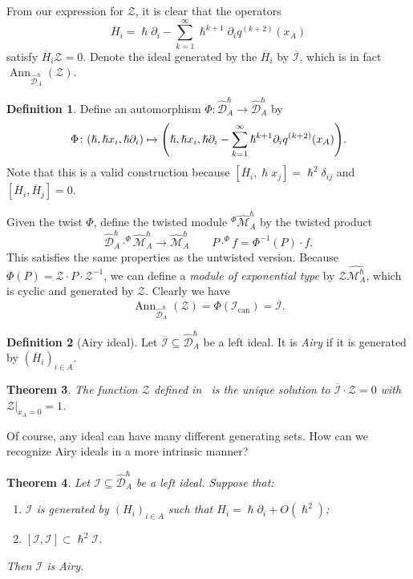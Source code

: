 \documentclass{amsart}
\newtheorem{thm}{Theorem}[section]
\theoremstyle{definition}
\newtheorem{defn}[thm]{Definition}
\theoremstyle{remark}
\theoremstyle{plain}
\theoremstyle{definition}
\theoremstyle{remark}
\newcommand{\mc}[1]{\mathcal{#1}}
\newcommand{\mr}[1]{\mathrm{#1}}
\newcommand{\on}[1]{\operatorname{#1}}
\newcommand{\ol}[1]{\overline{#1}}
\newcommand{\wh}[1]{\widehat{#1}}
\newcommand{\1}{\mathbf{1}}
\newcommand{\2}{\mathbf{2}}
\newcommand{\3}{\mathbf{3}}
\begin{document}
From our expression for $\mc{Z}$, it is clear that the operators
\[ \ol{H}_i = \hslash \partial_i - \sum_{k=1}^{\infty} \hslash^{k+1} \partial_i q^{(k+2)}(x_A) \]
satisfy $\ol{H}_i \mc{Z} = 0$. Denote the ideal generated by the $\ol{H}_i$ by $\ol{\mc{I}}$, which is in fact $\on{Ann}_{\wh{\mc{D}}_A^{\hslash}}(\mc{Z})$.

\begin{defn}
    Define an automorphism $\Phi \colon \wh{\mc{D}}_A^{\hslash} \to \wh{\mc{D}}_A^{\hslash}$ by
    \[ \Phi \colon (\hslash, \hslash x_i, \hslash \partial_i) \mapsto \qty(\hslash, \hslash x_i, \hslash \partial_i - \sum_{k=1}^{\infty} \hslash^{k+1} \partial_i q^{(k+2)}(x_A)). \]
    Note that this is a valid construction because $[\ol{H}_i, \hslash x_j] = \hslash^2 \delta_{ij}$ and $[\ol{H}_i, \ol{H}_j] = 0$.
\end{defn}

Given the twist $\Phi$, define the twisted module ${}^{\Phi}\wh{\mc{M}}_A^{\hslash}$ by the twisted product
\[ \wh{\mc{D}}_A^{\hslash} \cdot^{\Phi} \wh{\mc{M}}_A^{\hslash} \to \wh{\mc{M}}_A^{\hslash} \qquad P \cdot^{\Phi} f = \Phi^{-1}(P) \cdot f. \]
This satisfies the same properties as the untwisted version. Because $\Phi(P) = \mc{Z} \cdot P \cdot \mc{Z}^{-1}$, we can define a \textit{module of exponential type} by $\mc{Z} \wh{\mc{M}_A^{\hslash}}$, which is cyclic and generated by $\mc{Z}$. Clearly we have
\[ \on{Ann}_{\wh{\mc{D}}_A^{\hslash}}(\mc{Z}) = \Phi(\mc{I}_{\mr{can}}) = \ol{\mc{I}}. \]

\begin{defn}[Airy ideal]
    Let $\ol{\mc{I}} \subseteq \wh{\mc{D}}_A^{\hslash}$ be a left ideal. It is \textit{Airy} if it is generated by $(\ol{H}_i)_{i \in A}$.
\end{defn}

\begin{thm}
    The function $\mc{Z}$ defined in~ is the unique solution to $\ol{\mc{I}} \cdot \mc{Z} = 0$ with $\mc{Z} |_{x_A = 0} = 1$.
\end{thm}

Of course, any ideal can have many different generating sets. How can we recognize Airy ideals in a more intrinsic manner?

\begin{thm}{\cite{airytoprec}}\label{thm:charairy}
    Let $\mc{I} \subseteq \wh{\mc{D}}_A^{\hslash}$ be a left ideal. Suppose that:
    \begin{enumerate}
        \item $\mc{I}$ is generated by $(H_i)_{i \in A}$ such that $H_i = \hslash \partial_i + O(\hslash^2)$;
        \item $[\mc{I}, \mc{I}] \subset \hslash^2 \mc{I}$.
    \end{enumerate}
    Then $\mc{I}$ is Airy.
\end{thm}
\end{document}
